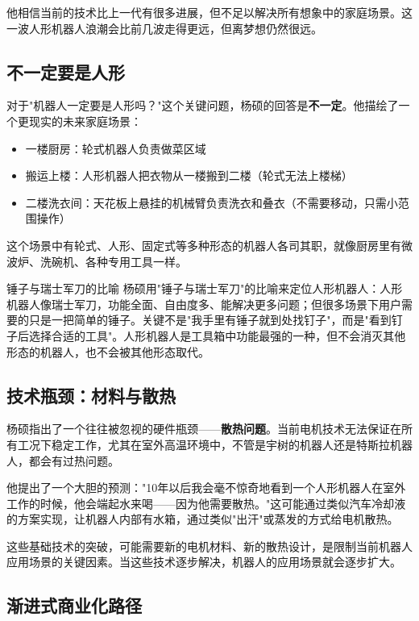 他相信当前的技术比上一代有很多进展，但不足以解决所有想象中的家庭场景。这一波人形机器人浪潮会比前几波走得更远，但离梦想仍然很远。

\subsection{不一定要是人形}

对于"机器人一定要是人形吗？"这个关键问题，杨硕的回答是\textbf{不一定}。他描绘了一个更现实的未来家庭场景：

\begin{itemize}
    \item 一楼厨房：轮式机器人负责做菜区域
    \item 搬运上楼：人形机器人把衣物从一楼搬到二楼（轮式无法上楼梯）
    \item 二楼洗衣间：天花板上悬挂的机械臂负责洗衣和叠衣（不需要移动，只需小范围操作）
\end{itemize}

这个场景中有轮式、人形、固定式等多种形态的机器人各司其职，就像厨房里有微波炉、洗碗机、各种专用工具一样。

\begin{warningbox}{锤子与瑞士军刀的比喻}
杨硕用"锤子与瑞士军刀"的比喻来定位人形机器人：人形机器人像瑞士军刀，功能全面、自由度多、能解决更多问题；但很多场景下用户需要的只是一把简单的锤子。关键不是"我手里有锤子就到处找钉子"，而是"看到钉子后选择合适的工具"。人形机器人是工具箱中功能最强的一种，但不会消灭其他形态的机器人，也不会被其他形态取代。
\end{warningbox}

\subsection{技术瓶颈：材料与散热}

杨硕指出了一个往往被忽视的硬件瓶颈——\textbf{散热问题}。当前电机技术无法保证在所有工况下稳定工作，尤其在室外高温环境中，不管是宇树的机器人还是特斯拉机器人，都会有过热问题。

他提出了一个大胆的预测："10年以后我会毫不惊奇地看到一个人形机器人在室外工作的时候，他会端起水来喝——因为他需要散热。"这可能通过类似汽车冷却液的方案实现，让机器人内部有水箱，通过类似"出汗"或蒸发的方式给电机散热。

这些基础技术的突破，可能需要新的电机材料、新的散热设计，是限制当前机器人应用场景的关键因素。当这些技术逐步解决，机器人的应用场景就会逐步扩大。

\subsection{渐进式商业化路径}


